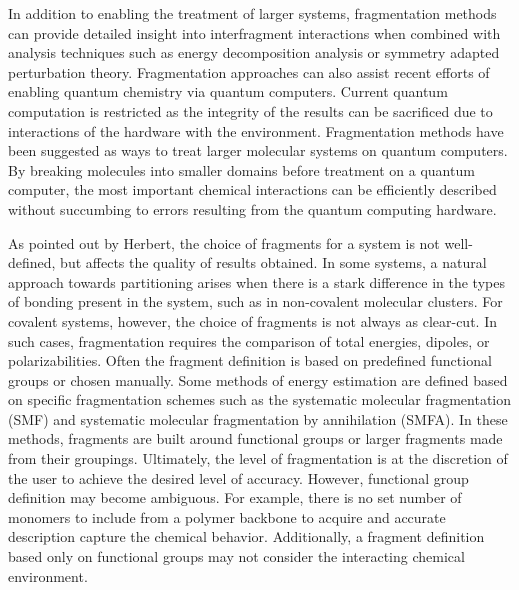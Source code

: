 In addition to enabling the treatment of larger systems, fragmentation methods can provide detailed insight into interfragment interactions when combined with analysis techniques such as energy decomposition analysis or symmetry adapted perturbation theory.\autocite{jeziorski_perturbation_1994,sapt1,Lambrecht2019,Berquist2018,Khaliullin2007}
Fragmentation approaches can also assist recent efforts of enabling quantum chemistry via quantum computers. 
Current quantum computation is restricted as the integrity of the results can be sacrificed due to interactions of the hardware with the environment. Fragmentation methods have been suggested as ways to treat larger molecular systems on quantum computers.
By breaking molecules into smaller domains before treatment on a quantum computer, the most important chemical interactions can be efficiently described without succumbing to errors resulting from the quantum computing hardware.\autocite{yamazaki2018practical}

As pointed out by Herbert, the choice of fragments for a system is not well-defined, but affects the quality of results obtained.\autocite{Herbert2019}
In some systems, a natural approach towards partitioning arises when there is a stark difference in the types of bonding present in the system, such as in non-covalent molecular clusters. 
For covalent systems, however, the choice of fragments is not always as clear-cut. 
In such cases, fragmentation requires the comparison of total energies, dipoles, or polarizabilities.
Often the fragment definition is based on predefined functional groups or chosen manually.\autocite{muller_flexible_2019}
Some methods of energy estimation are defined based on specific fragmentation schemes such as the systematic molecular fragmentation (SMF) and systematic molecular fragmentation by annihilation (SMFA).\autocite{doi:10.1063/1.1879792,10.1063/1.2347710,10.1063/1.3222639,C2CP23832B,Kobayashi2019}
In these methods, fragments are built around functional groups or larger fragments made from their groupings.
Ultimately, the level of fragmentation is at the discretion of the user to achieve the desired level of accuracy.
However, functional group definition may become ambiguous.
For example, there is no set number of monomers to include from a polymer backbone to acquire and accurate description capture the chemical behavior.
Additionally, a fragment definition based only on functional groups may not consider the interacting chemical environment. 

